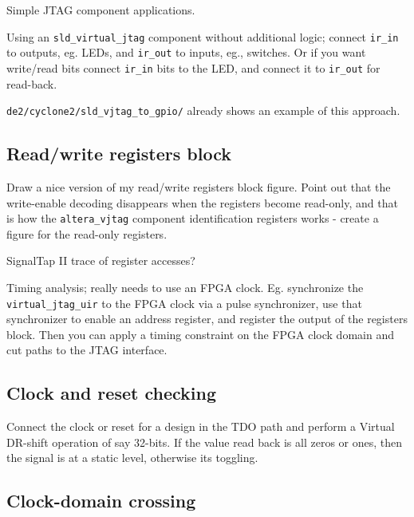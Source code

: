 \documentclass[10pt,twoside]{article}
\begin{document}
Simple JTAG component applications.

Using an \verb+sld_virtual_jtag+ component without additional
logic; connect \verb+ir_in+ to outputs, eg. LEDs, and \verb+ir_out+
to inputs, eg., switches. Or if you want write/read bits connect
\verb+ir_in+ bits to the LED, and connect it to \verb+ir_out+
for read-back.

\verb+de2/cyclone2/sld_vjtag_to_gpio/+ already shows an example
of this approach.

\subsection{Read/write registers block}

Draw a nice version of my read/write registers block figure.
Point out that the write-enable decoding disappears when
the registers become read-only, and that is how the 
\verb+altera_vjtag+ component identification registers
works - create a figure for the read-only registers.

SignalTap II trace of register accesses?

Timing analysis; really needs to use an FPGA clock. Eg.
synchronize the \verb+virtual_jtag_uir+ to the FPGA
clock via a pulse synchronizer, use that synchronizer
to enable an address register, and register the output
of the registers block. Then you can apply a timing
constraint on the FPGA clock domain and cut paths to
the JTAG interface.

\subsection{Clock and reset checking}

Connect the clock or reset for a design in the TDO path and
perform a Virtual DR-shift operation of say 32-bits. If
the value read back is all zeros or ones, then the signal
is at a static level, otherwise its toggling.

\subsection{Clock-domain crossing}
\end{document}
